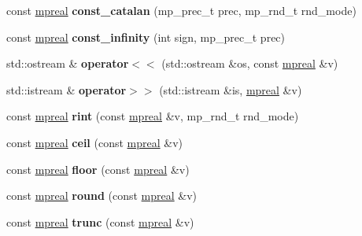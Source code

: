 \begin{DoxyCompactItemize}
const \hyperlink{classmpfr_1_1mpreal}{mpreal} {\bfseries const\+\_\+catalan} (mp\+\_\+prec\+\_\+t prec, mp\+\_\+rnd\+\_\+t rnd\+\_\+mode)
\item 
\mbox{\label{classmpfr_1_1mpreal_a3c39e7991c240d42dd568412a7a4f41b}} 
const \hyperlink{classmpfr_1_1mpreal}{mpreal} {\bfseries const\+\_\+infinity} (int sign, mp\+\_\+prec\+\_\+t prec)
\item 
\mbox{\label{classmpfr_1_1mpreal_a777669be7a1401649a85a77e148f48c0}} 
std\+::ostream \& {\bfseries operator$<$$<$} (std\+::ostream \&os, const \hyperlink{classmpfr_1_1mpreal}{mpreal} \&v)
\item 
\mbox{\label{classmpfr_1_1mpreal_a4794a8726e371763295dea52873c78a5}} 
std\+::istream \& {\bfseries operator$>$$>$} (std\+::istream \&is, \hyperlink{classmpfr_1_1mpreal}{mpreal} \&v)
\item 
\mbox{\label{classmpfr_1_1mpreal_abe1241c4f9f70875e9782d024cd15885}} 
const \hyperlink{classmpfr_1_1mpreal}{mpreal} {\bfseries rint} (const \hyperlink{classmpfr_1_1mpreal}{mpreal} \&v, mp\+\_\+rnd\+\_\+t rnd\+\_\+mode)
\item 
\mbox{\label{classmpfr_1_1mpreal_a721c4bb16283155598236a07fb141039}} 
const \hyperlink{classmpfr_1_1mpreal}{mpreal} {\bfseries ceil} (const \hyperlink{classmpfr_1_1mpreal}{mpreal} \&v)
\item 
\mbox{\label{classmpfr_1_1mpreal_a648150f2fbbf6d7041e9c4b8d46a4325}} 
const \hyperlink{classmpfr_1_1mpreal}{mpreal} {\bfseries floor} (const \hyperlink{classmpfr_1_1mpreal}{mpreal} \&v)
\item 
\mbox{\label{classmpfr_1_1mpreal_a3a27e2ba06c4c9053627076397213c81}} 
const \hyperlink{classmpfr_1_1mpreal}{mpreal} {\bfseries round} (const \hyperlink{classmpfr_1_1mpreal}{mpreal} \&v)
\item 
\mbox{\label{classmpfr_1_1mpreal_ab572abbb811928c695eadcd587fa2e43}} 
const \hyperlink{classmpfr_1_1mpreal}{mpreal} {\bfseries trunc} (const \hyperlink{classmpfr_1_1mpreal}{mpreal} \&v)
\item 

\end{DoxyCompactItemize}
